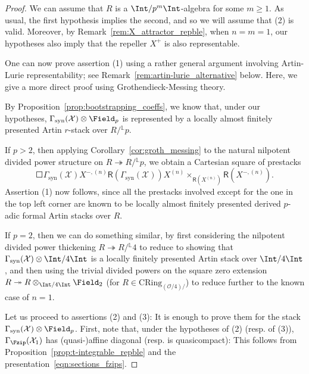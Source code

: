 \documentclass[10pt]{amsart}
\begin{document}
\begin{proof}
We can assume that $R$ is a $\Int/p^m\Int$-algebra for some $m\ge 1$. As usual, the first hypothesis implies the second, and so we will assume that (2) is valid. Moreover, by Remark~\ref{rem:X_attractor_repble}, when $n=m=1$, our hypotheses also imply that the repeller $X^+$ is also representable.

One can now prove assertion (1) using a rather general argument involving Artin-Lurie representability; see Remark~\ref{rem:artin-lurie_alternative} below. Here, we give a more direct proof using Grothendieck-Messing theory. 

By Proposition~\ref{prop:bootstrapping_coeffs}, we know that, under our hypotheses, $\Gamma_{\mathrm{syn}}(\mathcal{X})\otimes\Field_p$ is represented by a locally almost finitely presented Artin $r$-stack over $R/{}^{\mathbb{L}}p$.

If $p>2$, then applying Corollary~\ref{cor:groth_messing} to the natural nilpotent divided power structure on $R\twoheadrightarrow R/{}^{\mathbb{L}}p$, we obtain a Cartesian square of prestacks
\[
\Square{\Gamma_{\mathrm{syn}}(\mathcal{X})}{}{X^{-,(n)}}{}{}{\mathsf{R}(\Gamma_{\mathrm{syn}}(\mathcal{X}))}{}{X^{(n)}\times_{\mathsf{R}(X^{(n)})}\mathsf{R}(X^{-,(n)})}.
\] 
Assertion (1) now follows, since all the prestacks involved except for the one in the top left corner are known to be locally almost finitely presented derived $p$-adic formal Artin stacks over $R$.

If $p=2$, then we can do something similar, by first considering the nilpotent divided power thickening $R\twoheadrightarrow R/{}^{\mathbb{L}}4$ to reduce to showing that $\Gamma_{\mathrm{syn}}(\mathcal{X})\otimes\Int/4\Int$ is a locally finitely presented Artin stack over $\Int/4\Int$, and then using the trivial divided powers on the square zero extension $R\twoheadrightarrow R\otimes_{\Int/4\Int}\Field_2$ (for $R\in \mathrm{CRing}_{(\mathcal{O}/4)/}$) to reduce further to the known case of $n=1$.

Let us proceed to assertions (2) and (3): It is enough to prove them for the stack $\Gamma_{\mathrm{syn}}(\mathcal{X})\otimes\Field_p$. First, note that, under the hypotheses of (2)  (resp. of (3)), $\Gamma_{\Fzip}(\mathcal{X}_1)$ has (quasi-)affine diagonal (resp. is quasicompact): This follows from Proposition~\ref{prop:t-integrable_repble} and the presentation~\eqref{eqn:sections_fzips}. 


\end{proof}
\end{document}
